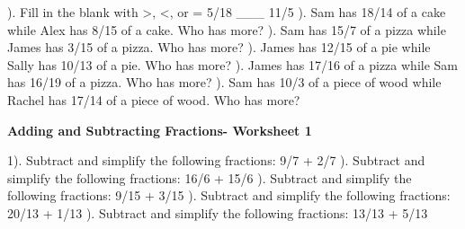 \documentclass{article}%
\begin{document}
). Fill in the blank with >, <, or = 5/18 \_\_\_ 11/5%
\newline%
\newline%
). Sam has 18/14 of a cake while Alex has 8/15 of a cake. Who has more?%
\newline%
\newline%
). Sam has 15/7 of a pizza while James has 3/15 of a pizza. Who has more?%
\newline%
\newline%
). James has 12/15 of a pie while Sally has 10/13 of a pie. Who has more?%
\newline%
\newline%
). James has 17/16 of a pizza while Sam has 16/19 of a pizza. Who has more?%
\newline%
\newline%
). Sam has 10/3 of a piece of wood while Rachel has 17/14 of a piece of wood. Who has more?%
\newline%
\newline%
\newline%
\pagebreak%
\large%
\begin{center}%
\textbf{Adding and Subtracting Fractions- Worksheet 1}%
\newline%
\end{center} \normalsize%
1). Subtract and simplify the following fractions: 9/7 + 2/7%
\newline%
\newline%
). Subtract and simplify the following fractions: 16/6 + 15/6%
\newline%
\newline%
). Subtract and simplify the following fractions: 9/15 + 3/15%
\newline%
\newline%
). Subtract and simplify the following fractions: 20/13 + 1/13%
\newline%
\newline%
). Subtract and simplify the following fractions: 13/13 + 5/13%
\newline%
\end{document}
